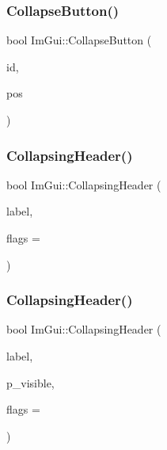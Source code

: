 \mbox{\label{namespaceImGui_acd027458d7a062d3d3073339454624e3}} 
\subsubsection{\texorpdfstring{Collapse\+Button()}{CollapseButton()}}
{\footnotesize\ttfamily bool Im\+Gui\+::\+Collapse\+Button (\begin{DoxyParamCaption}\item[{Im\+Gui\+ID}]{id,  }\item[{const \hyperlink{structImVec2}{Im\+Vec2} \&}]{pos }\end{DoxyParamCaption})}

\mbox{\label{namespaceImGui_ab52f9e08698c9d64abb05b98f5355146}} 
\subsubsection{\texorpdfstring{Collapsing\+Header()}{CollapsingHeader()}\hspace{0.1cm}{\footnotesize\ttfamily [1/2]}}
{\footnotesize\ttfamily bool Im\+Gui\+::\+Collapsing\+Header (\begin{DoxyParamCaption}\item[{const char $\ast$}]{label,  }\item[{Im\+Gui\+Tree\+Node\+Flags}]{flags = {} }\end{DoxyParamCaption})}

\mbox{\label{namespaceImGui_a4d6e6e7a5ace0e5dbee3ea1926ddf049}} 
\subsubsection{\texorpdfstring{Collapsing\+Header()}{CollapsingHeader()}\hspace{0.1cm}{\footnotesize\ttfamily [2/2]}}
{\footnotesize\ttfamily bool Im\+Gui\+::\+Collapsing\+Header (\begin{DoxyParamCaption}\item[{const char $\ast$}]{label,  }\item[{bool $\ast$}]{p\+\_\+visible,  }\item[{Im\+Gui\+Tree\+Node\+Flags}]{flags = {} }\end{DoxyParamCaption})}

